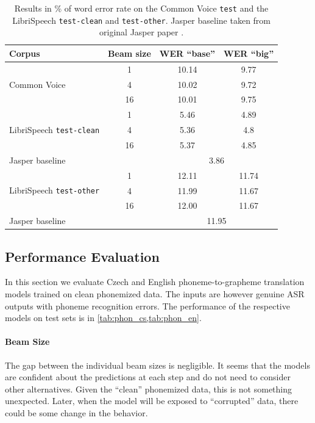 \begin{table}[t]
	\centering
	\begin{tabular}{lc|cc}
		\bf Corpus & \bf Beam size & \bf WER ``base''& \bf WER ``big'' \\
		\hline
		\multirow{3}{*}{Common Voice}    & 1    &10.14    &    9.77    \\
		& 4    & 10.02    &    9.72    \\
		& 16    &10.01    & 9.75    \\
		\hline
		
		\multirow{3}{*}{LibriSpeech \texttt{test-clean}}    & 1    &    5.46 &    4.89    \\
		& 4    &  5.36 &    4.8    \\
		& 16     &5.37    & 4.85    \\
		\multicolumn{2}{l|}{Jasper baseline} & \multicolumn{2}{c}{3.86} \\
		\hline
		
		\multirow{3}{*}{LibriSpeech \texttt{test-other}}    & 1    &    12.11 &11.74    \\
		& 4    & 11.99     &    11.67    \\
		& 16    & 12.00     & 11.67    \\
		\multicolumn{2}{l|}{Jasper baseline} & \multicolumn{2}{c}{11.95} \\
		
	\end{tabular}
	
	\caption[English enhanced ASR results]{Results in \% of word error rate on the Common Voice \texttt{test} and the LibriSpeech \texttt{test-clean} and \texttt{test-other}. Jasper baseline taken from original Jasper paper .}
	\label{tab:phon_en}
\end{table}


\subsection{Performance Evaluation}
In this section we evaluate Czech and English phoneme-to-grapheme translation models trained on clean phonemized data. The inputs are however genuine ASR outputs with phoneme recognition errors. The performance of the respective models on test sets is in \cref{tab:phon_cs,tab:phon_en}.

\paragraph{Beam Size} The gap between the individual beam sizes is negligible. It seems that the models are confident about the predictions at each step and do not need to consider other alternatives. Given the ``clean'' phonemized data, this is not something unexpected. Later, when the model will be exposed to ``corrupted'' data, there could be some change in the behavior.

